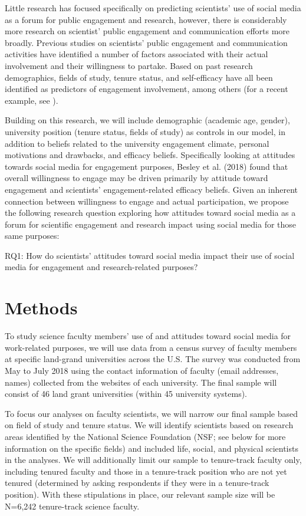 \documentclass[12pt,]{article}
\begin{document}
Little research has focused specifically on predicting scientists' use of social media as a forum for public engagement and research, however, there is considerably more research on scientist' public engagement and communication efforts more broadly. Previous studies on scientists' public engagement and communication activities have identified a number of factors associated with their actual involvement and their willingness to partake. Based on past research demographics, fields of study, tenure status, and self-efficacy have all been identified as predictors of engagement involvement, among others (for a recent example, see \textcite{besley2018understanding}).

Building on this research, we will include demographic (academic age, gender), university position (tenure status, fields of study) as controls in our model, in addition to beliefs related to the university engagement climate, personal motivations and drawbacks, and efficacy beliefs. Specifically looking at attitudes towards social media for engagement purposes, Besley et al. (2018) found that overall willingness to engage may be driven primarily by attitude toward engagement and scientists' engagement-related efficacy beliefs. Given an inherent connection between willingness to engage and actual participation, we propose the following research question exploring how attitudes toward social media as a forum for scientific engagement and research impact using social media for those same purposes:

RQ1: How do scientists' attitudes toward social media impact their use of social media for engagement and research-related purposes?

\hypertarget{methods}{%
\section{Methods}\label{methods}}

To study science faculty members' use of and attitudes toward social media for work-related purposes, we will use data from a census survey of faculty members at specific land-grand universities across the U.S. The survey was conducted from May to July 2018 using the contact information of faculty (email addresses, names) collected from the websites of each university. The final sample will consist of 46 land grant universities (within 45 university systems).

To focus our analyses on faculty scientists, we will narrow our final sample based on field of study and tenure status. We will identify scientists based on research areas identified by the National Science Foundation (NSF; see below for more information on the specific fields) and included life, social, and physical scientists in the analyses. We will additionally limit our sample to tenure-track faculty only, including tenured faculty and those in a tenure-track position who are not yet tenured (determined by asking respondents if they were in a tenure-track position). With these stipulations in place, our relevant sample size will be N=6,242 tenure-track science faculty.
\end{document}

